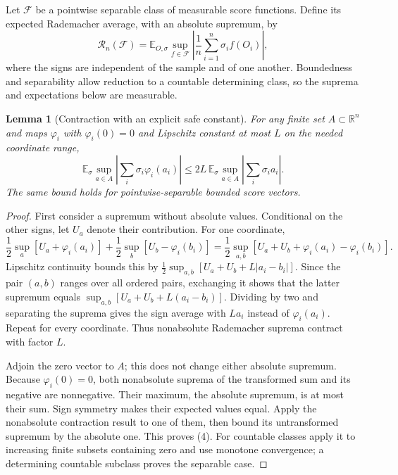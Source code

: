\documentclass[11pt]{article}
\newtheorem{lemma}[theorem]{Lemma}
\theoremstyle{definition}
\begin{document}
Let $\mathcal F$ be a pointwise separable class of measurable score
functions. Define its expected Rademacher average, with an absolute
supremum, by
\[
 \mathcal R_n(\mathcal F)
 =\mathbb E_{O,\sigma}\sup_{f\in\mathcal F}
             \left|\frac1n\sum_{i=1}^n\sigma_i f(O_i)\right|,
\]
where the signs are independent of the sample and of one another.
Boundedness and separability allow reduction to a countable determining
class, so the suprema and expectations below are measurable.

\begin{lemma}[Contraction with an explicit safe constant]
For any finite set $A\subset\mathbb R^n$ and maps $\varphi_i$ with
$\varphi_i(0)=0$ and Lipschitz constant at most $L$ on the needed
coordinate range,
\[
 \mathbb E_\sigma\sup_{a\in A}
        \left|\sum_i\sigma_i\varphi_i(a_i)\right|
 \le2L\,\mathbb E_\sigma\sup_{a\in A}
        \left|\sum_i\sigma_i a_i\right|.              \tag{4}
\]
The same bound holds for pointwise-separable bounded score vectors.
\end{lemma}
\begin{proof}
First consider a supremum without absolute values. Conditional on the
other signs, let $U_a$ denote their contribution. For one coordinate,
\[
 \frac12\sup_a[U_a+\varphi_i(a_i)]
 +\frac12\sup_b[U_b-\varphi_i(b_i)]
 =\frac12\sup_{a,b}[U_a+U_b+\varphi_i(a_i)-\varphi_i(b_i)].
\]
Lipschitz continuity bounds this by
$\tfrac12\sup_{a,b}[U_a+U_b+L|a_i-b_i|]$.
Since the pair $(a,b)$ ranges over all ordered pairs, exchanging it
shows that the latter supremum equals
$\sup_{a,b}[U_a+U_b+L(a_i-b_i)]$. Dividing by two and separating the
suprema gives the sign average with $L a_i$ instead of
$\varphi_i(a_i)$. Repeat for every coordinate. Thus nonabsolute
Rademacher suprema contract with factor $L$.

Adjoin the zero vector to $A$; this does not change either absolute
supremum. Because $\varphi_i(0)=0$, both nonabsolute suprema of the
transformed sum and its negative are nonnegative. Their maximum, the
absolute supremum, is at most their sum. Sign symmetry makes their
expected values equal. Apply the nonabsolute contraction result to one
of them, then bound its untransformed supremum by the absolute one.
This proves (4). For countable classes apply it to increasing finite
subsets containing zero and use monotone convergence; a determining
countable subclass proves the separable case.
\end{proof}
\end{document}
